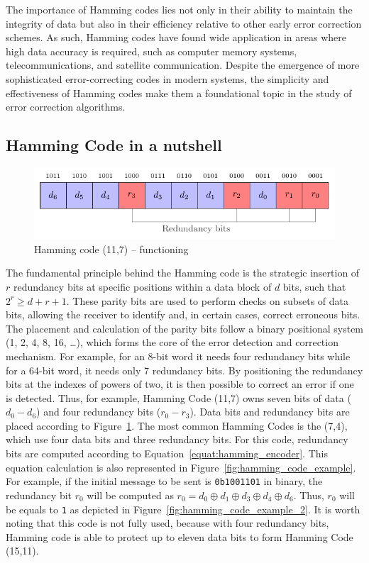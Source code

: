 The importance of Hamming codes lies not only in their ability to maintain the integrity of data but also in their efficiency relative to other early error correction schemes. As such, Hamming codes have found wide application in areas where high data accuracy is required, such as computer memory systems, telecommunications, and satellite communication. Despite the emergence of more sophisticated error-correcting codes in modern systems, the simplicity and effectiveness of Hamming codes make them a foundational topic in the study of error correction algorithms.

\subsection{Hamming Code in a nutshell}

\begin{figure}[ht]
    \centering
    \includegraphics[page=1]{c5_countermeasures_dift/img/hamming_bit.pdf}
    \caption{Hamming code (11,7) -- functioning}
    \label{fig:hamming_functionning}
\end{figure}

The fundamental principle behind the Hamming code is the strategic insertion of $r$ redundancy bits at specific positions within a data block of $d$ bits, such that \(2^r \geqslant d + r + 1\).
These parity bits are used to perform checks on subsets of data bits, allowing the receiver to identify and, in certain cases, correct erroneous bits. The placement and calculation of the parity bits follow a binary positional system (1, 2, 4, 8, 16, \ldots), which forms the core of the error detection and correction mechanism. For example, for an 8-bit word it needs four redundancy bits while for a 64-bit word, it needs only 7 redundancy bits. By positioning the redundancy bits at the indexes of powers of two, it is then possible to correct an error if one is detected. Thus, for example, Hamming Code (11,7) owns seven bits of data ($d_{0}-d_{6}$) and four redundancy bits ($r_{0}-r_{3}$). Data bits and redundancy bits are placed according to Figure~\ref{fig:hamming_functionning}. The most common Hamming Codes is the (7,4), which use four data bits and three redundancy bits.
For this code, redundancy bits are computed according to Equation~\ref{equat:hamming_encoder}. This equation calculation is also represented in Figure~\ref{fig:hamming_code_example}. For example, if the initial message to be sent is \texttt{0b1001101} in binary, the redundancy bit $r_0$ will be computed as $r_0 = d_{0} \oplus d_{1} \oplus d_{3} \oplus d_{4} \oplus d_{6}$. Thus, $r_0$ will be equals to \texttt{1} as depicted in Figure~\ref{fig:hamming_code_example_2}. It is worth noting that this code is not fully used, because with four redundancy bits, Hamming code is able to protect up to eleven data bits to form Hamming Code (15,11).

